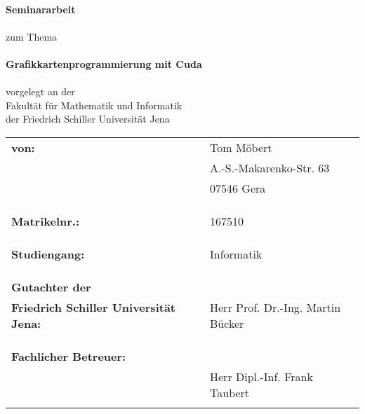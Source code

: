 \documentclass[a4paper,oneside,numbers=noenddot,fontsize=12pt,open=right]{scrreprt}
\title{\thema}
\def \author{Tom Möbert}
\def \matrikelnummer{167510}
\def \betrieb{Carl Zeiss SMT GmbH}
\def \hochschule{Friedrich Schiller Universität Jena}
\def \hochschuleGenitivS{\hochschule}
\def \fmi{Fakultät für Mathematik und Informatik}
\def \studiengang{Informatik}
\def \arbeit{Seminararbeit}
\def \thema{Grafikkartenprogrammierung mit Cuda}
\begin{document}
\begin{titlepage}
    \begin{center}
    ~\vspace{1cm}\\
   {\fontsize{35}{45}\selectfont \textbf{\MakeUppercase \arbeit}}\\
    ~\vspace{0.5cm}\\
    zum Thema\\
    ~\vspace{0.5cm}\\
    \textbf{\glqq\thema\grqq}\\
    ~\vspace{0.5cm}\\
    vorgelegt an der\\
    {\fmi}\\
    {der \hochschuleGenitivS}
    \vspace{2cm}

 \normalsize{
    \begin{tabular}{lrl}
    	\textbf{von:} &~& {\author} \\
    	&~& A.-S.-Makarenko-Str. 63 \\
    	&~& 07546 Gera \\ \\ \\ \\ 
    	\textbf{Matrikelnr.:}&~& {\matrikelnummer} \\ \\ \\ \\
    	\textbf{Studiengang:} &~& {\studiengang} \\ \\ \\ \\
		\textbf{Gutachter der }\\ \textbf{\hochschule:} &~& Herr Prof. Dr.-Ing. Martin Bücker \\ \\ \\ \\
    	\textbf{Fachlicher Betreuer:}\\ &~& Herr Dipl.-Inf. Frank Taubert \\ \\
    \end{tabular}\\
    }
  \end{center}
\end{titlepage}
\end{document}

